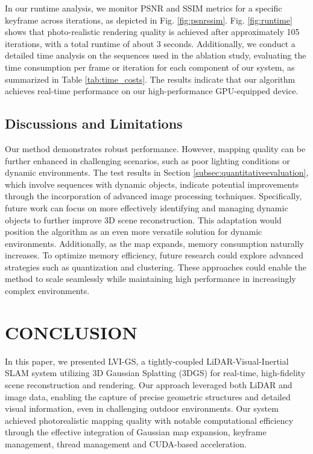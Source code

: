 \documentclass[lettersize,journal]{IEEEtran}
\begin{document}
In our runtime analysis, we monitor PSNR and SSIM metrics for a specific keyframe across iterations, as depicted in Fig. 
\ref{fig:psnrssim}. Fig. \ref{fig:runtime} shows that photo-realistic rendering quality is achieved after approximately 105 iterations, with a total runtime of about 3 seconds. Additionally, we conduct a detailed time analysis on the sequences used in the ablation study, evaluating the time consumption per frame or iteration for each component of our system, as summarized in Table \ref{tab:time_costs}. The results indicate that our algorithm achieves real-time performance on our high-performance GPU-equipped device.

\subsection{Discussions and Limitations}

Our method demonstrates robust performance. However, mapping quality can be further enhanced in challenging scenarios, such as poor lighting conditions or dynamic environments. The test results in Section \ref{subsec:quantitativeevaluation}, which involve sequences with dynamic objects, indicate potential improvements through the incorporation of advanced image processing techniques. Specifically, future work can focus on more effectively identifying and managing dynamic objects to further improve 3D scene reconstruction. This adaptation would position the algorithm as an even more versatile solution for dynamic environments. Additionally, as the map expands, memory consumption naturally increases. To optimize memory efficiency, future research could explore advanced strategies such as quantization and clustering. These approaches could enable the method to scale seamlessly while maintaining high performance in increasingly complex environments.

\section{CONCLUSION}
In this paper, we presented LVI-GS, a tightly-coupled LiDAR-Visual-Inertial SLAM system utilizing 3D Gaussian Splatting (3DGS) for real-time, high-fidelity scene reconstruction and rendering. Our approach leveraged both LiDAR and image data, enabling the capture of precise geometric structures and detailed visual information, even in challenging outdoor environments. Our system achieved photorealistic mapping quality with notable computational efficiency through the effective integration of Gaussian map expansion, keyframe management, thread management and CUDA-based acceleration.
\end{document}
